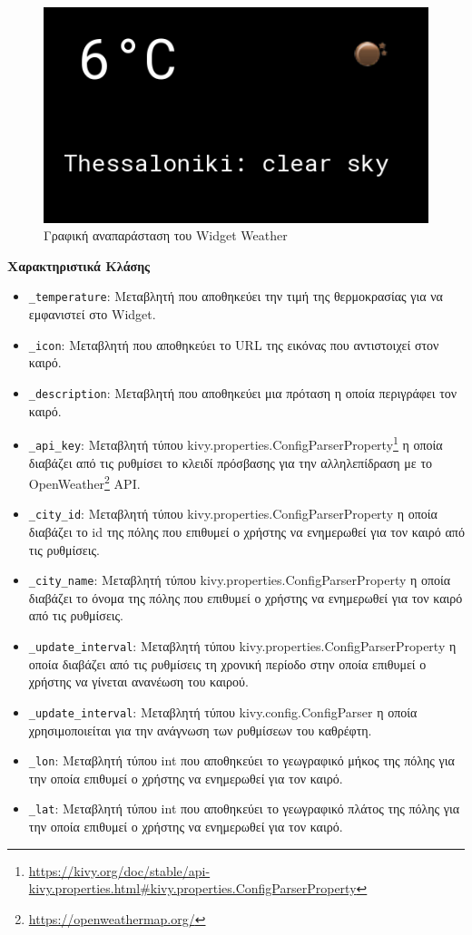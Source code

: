 \begin{figure}[h]
	\centering
	\includegraphics[scale=0.7]{images/chapter4/weather_widget.png}
	\caption{Γραφική αναπαράσταση του Widget Weather}
	\label{fig:weather_widget}
\end{figure}

\noindent\textbf{Χαρακτηριστικά Κλάσης}
\begin{itemize}
	\item \texttt{\_temperature}: Μεταβλητή που αποθηκεύει την τιμή της θερμοκρασίας για να εμφανιστεί στο Widget.
	\item \texttt{\_icon}: Μεταβλητή που αποθηκεύει το URL της εικόνας που αντιστοιχεί στον καιρό.
	\item \texttt{\_description}: Μεταβλητή που αποθηκεύει μια πρόταση η οποία περιγράφει τον καιρό.
	\item \texttt{\_api\_key}: Μεταβλητή τύπου kivy.properties.ConfigParserProperty\footnote{\href{https://kivy.org/doc/stable/api-kivy.properties.html\#kivy.properties.ConfigParserProperty}{https://kivy.org/doc/stable/api-kivy.properties.html\#kivy.properties.ConfigParserProperty}} η οποία διαβάζει από τις ρυθμίσει το κλειδί πρόσβασης για την αλληλεπίδραση με το OpenWeather\footnote{\href{https://openweathermap.org/}{https://openweathermap.org/}} API.
	\item \texttt{\_city\_id}: Μεταβλητή τύπου kivy.properties.ConfigParserProperty η οποία διαβάζει το id της πόλης που επιθυμεί ο χρήστης να ενημερωθεί για τον καιρό από τις ρυθμίσεις.
	\item \texttt{\_city\_name}: Μεταβλητή τύπου kivy.properties.ConfigParserProperty η οποία διαβάζει το όνομα της πόλης που επιθυμεί ο χρήστης να ενημερωθεί για τον καιρό από τις ρυθμίσεις.
	\item \texttt{\_update\_interval}: Μεταβλητή τύπου kivy.properties.ConfigParserProperty η οποία διαβάζει από τις ρυθμίσεις τη χρονική περίοδο στην οποία επιθυμεί ο χρήστης να γίνεται ανανέωση του καιρού.
	\item \texttt{\_update\_interval}: Μεταβλητή τύπου kivy.config.ConfigParser η οποία χρησιμοποιείται για την ανάγνωση των ρυθμίσεων του καθρέφτη.
	\item \texttt{\_lon}: Μεταβλητή τύπου int που αποθηκεύει το γεωγραφικό μήκος της πόλης για την οποία επιθυμεί ο χρήστης να ενημερωθεί για τον καιρό.
	\item \texttt{\_lat}: Μεταβλητή τύπου int που αποθηκεύει το γεωγραφικό πλάτος της πόλης για την οποία επιθυμεί ο χρήστης να ενημερωθεί για τον καιρό.
\end{itemize}


